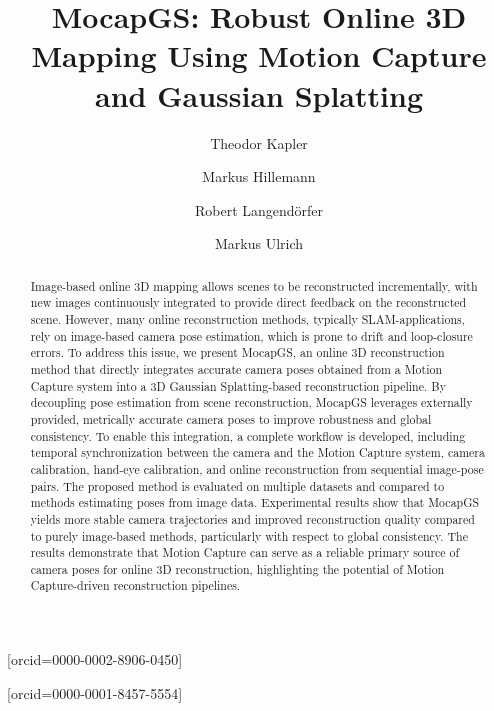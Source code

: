 \documentclass[a4paper,fleqn]{cas-dc}
\begin{document}
\let\WriteBookmarks\relax
\def\floatpagepagefraction{1}
\def\textpagefraction{.001}



\title [mode = title]{MocapGS: Robust Online 3D Mapping Using Motion Capture and Gaussian Splatting}  

\author[1]{Theodor Kapler}%
\cormark[1]

\author[1]{Markus Hillemann}[orcid=0000-0002-8906-0450]

\author[1]{Robert Langendörfer}

\author[1]{Markus Ulrich}[orcid=0000-0001-8457-5554]


\begin{abstract}
Image-based online 3D mapping allows scenes to be reconstructed incrementally, with new images continuously integrated to provide direct feedback on the reconstructed scene. However, many online reconstruction methods, typically SLAM-applications, rely on image-based camera pose estimation, which is prone to drift and loop-closure errors. To address this issue, we present MocapGS, an online 3D reconstruction method that directly integrates accurate camera poses obtained from a Motion Capture system into a 3D Gaussian Splatting-based reconstruction pipeline. By decoupling pose estimation from scene reconstruction, MocapGS leverages externally provided, metrically accurate camera poses to improve robustness and global consistency. To enable this integration, a complete workflow is developed, including temporal synchronization between the camera and the Motion Capture system, camera calibration, hand-eye calibration, and online reconstruction from sequential image-pose pairs. The proposed method is evaluated on multiple datasets and compared to methods estimating poses from image data. Experimental results show that MocapGS yields more stable camera trajectories and improved reconstruction quality compared to purely image-based methods, particularly with respect to global consistency. The results demonstrate that Motion Capture can serve as a reliable primary source of camera poses for online 3D reconstruction, highlighting the potential of Motion Capture-driven reconstruction pipelines.
\end{abstract}
\end{document}

